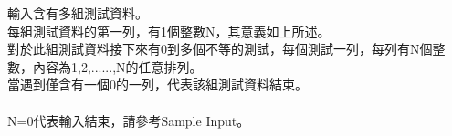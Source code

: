 輸入含有多組測試資料。\\
每組測試資料的第一列，有1個整數N，其意義如上所述。\\
對於此組測試資料接下來有0到多個不等的測試，每個測試一列，每列有N個整數，內容為1,2,......,N的任意排列。\\
當遇到僅含有一個0的一列，代表該組測試資料結束。\\
\\
N=0代表輸入結束，請參考Sample Input。\\
